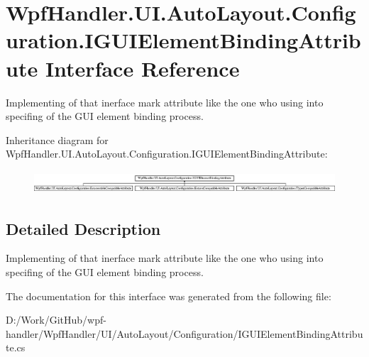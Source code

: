 \hypertarget{interface_wpf_handler_1_1_u_i_1_1_auto_layout_1_1_configuration_1_1_i_g_u_i_element_binding_attribute}{}\section{Wpf\+Handler.\+U\+I.\+Auto\+Layout.\+Configuration.\+I\+G\+U\+I\+Element\+Binding\+Attribute Interface Reference}
\label{interface_wpf_handler_1_1_u_i_1_1_auto_layout_1_1_configuration_1_1_i_g_u_i_element_binding_attribute}


Implementing of that inerface mark attribute like the one who using into specifing of the G\+UI element binding process.  


Inheritance diagram for Wpf\+Handler.\+U\+I.\+Auto\+Layout.\+Configuration.\+I\+G\+U\+I\+Element\+Binding\+Attribute\+:\begin{figure}[H]
\begin{center}
\leavevmode
\includegraphics[height=0.868217cm]{d6/d41/interface_wpf_handler_1_1_u_i_1_1_auto_layout_1_1_configuration_1_1_i_g_u_i_element_binding_attribute}
\end{center}
\end{figure}


\subsection{Detailed Description}
Implementing of that inerface mark attribute like the one who using into specifing of the G\+UI element binding process. 



The documentation for this interface was generated from the following file\+:\begin{DoxyCompactItemize}
\item 
D\+:/\+Work/\+Git\+Hub/wpf-\/handler/\+Wpf\+Handler/\+U\+I/\+Auto\+Layout/\+Configuration/I\+G\+U\+I\+Element\+Binding\+Attribute.\+cs\end{DoxyCompactItemize}
